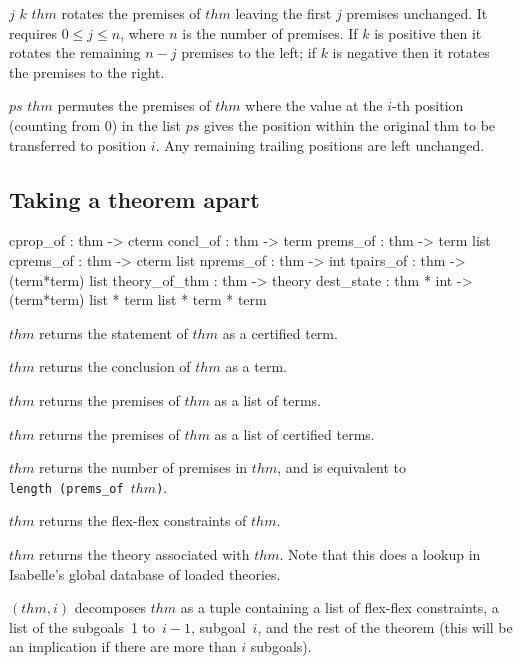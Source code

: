 \begin{ttdescription}
\item[\ttindexbold{permute_prems} $j$ $k$ $thm$] rotates the premises of $thm$
  leaving the first $j$ premises unchanged.  It
  requires $0\leq j\leq n$, where $n$ is the number of premises.  If $k$ is
  positive then it rotates the remaining $n-j$ premises to the left; if $k$ is
  negative then it rotates the premises to the right.

\item[\ttindexbold{rearrange_prems} $ps$ $thm$] permutes the premises of $thm$
   where the value at the $i$-th position (counting from $0$) in the list $ps$
   gives the position within the original thm to be transferred to position $i$.
   Any remaining trailing positions are left unchanged.
\end{ttdescription}


\subsection{Taking a theorem apart}
\begin{ttbox} 
cprop_of      : thm -> cterm
concl_of      : thm -> term
prems_of      : thm -> term list
cprems_of     : thm -> cterm list
nprems_of     : thm -> int
tpairs_of     : thm -> (term*term) list
theory_of_thm : thm -> theory
dest_state : thm * int -> (term*term) list * term list * term * term
\end{ttbox}
\begin{ttdescription}
\item[\ttindexbold{cprop_of} $thm$] returns the statement of $thm$ as
  a certified term.
  
\item[\ttindexbold{concl_of} $thm$] returns the conclusion of $thm$ as
  a term.
  
\item[\ttindexbold{prems_of} $thm$] returns the premises of $thm$ as a
  list of terms.
  
\item[\ttindexbold{cprems_of} $thm$] returns the premises of $thm$ as
  a list of certified terms.

\item[\ttindexbold{nprems_of} $thm$] 
returns the number of premises in $thm$, and is equivalent to {\tt
  length~(prems_of~$thm$)}.

\item[\ttindexbold{tpairs_of} $thm$] returns the flex-flex constraints
  of $thm$.
  
\item[\ttindexbold{theory_of_thm} $thm$] returns the theory associated
  with $thm$.  Note that this does a lookup in Isabelle's global
  database of loaded theories.

\item[\ttindexbold{dest_state} $(thm,i)$] 
decomposes $thm$ as a tuple containing a list of flex-flex constraints, a
list of the subgoals~1 to~$i-1$, subgoal~$i$, and the rest of the theorem
(this will be an implication if there are more than $i$ subgoals).

\end{ttdescription}


